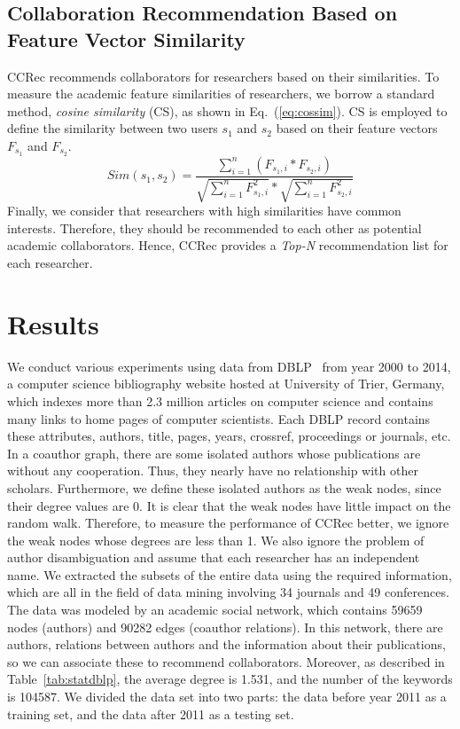 \documentclass[10pt,letterpaper]{article}
\begin{document}
\subsection*{Collaboration Recommendation Based on Feature Vector Similarity}
CCRec recommends collaborators for researchers based on their similarities. To measure the academic feature similarities of researchers, we borrow a standard method, \emph{cosine similarity} (CS), as shown in Eq.~(\ref{eq:cossim}). CS is employed to define the similarity between two users $s_{1}$ and $s_{2}$ based on their feature vectors $F_{s_{1}}$ and $F_{s_{2}}$.
\begin{equation}\label{eq:cossim}
Sim(s_{1},s_{2})=\frac{\sum_{i=1}^{n}(F_{s_{1},i}*F_{s_{2},i})}{\sqrt{\sum_{i=1}^{n}F_{s_{1},i}^2}*\sqrt{\sum_{i=1}^{n}F_{s_{2},i}^2}}
\end{equation}
Finally, we consider that researchers with high similarities have common interests. Therefore, they should be recommended to each other as potential academic collaborators. Hence, CCRec provides a \emph{Top-N} recommendation list for each researcher.

\section*{Results}
We conduct various experiments using data from DBLP~\cite{Ley:DBLP} from year 2000 to 2014, a computer science bibliography website hosted at University of Trier, Germany, which indexes more than 2.3 million articles on computer science and contains many links to home pages of computer scientists. Each DBLP record contains these attributes, authors, title, pages, years, crossref, proceedings or journals, etc. In a coauthor graph, there are some isolated authors whose publications are without any cooperation. Thus, they nearly have no relationship with other scholars. Furthermore, we define these isolated authors as the weak nodes, since their degree values are 0. It is clear that the weak nodes have little impact on the random walk. Therefore, to measure the performance of CCRec better, we ignore the weak nodes whose degrees are less than 1. We also ignore the problem of author disambiguation and assume that each researcher has an independent name. We extracted the subsets of the entire data using the required information, which are all in the field of data mining involving 34 journals and 49 conferences. The data was modeled by an academic social network, which contains 59659 nodes (authors) and 90282 edges (coauthor relations). In this network, there are authors, relations between authors and the information about their publications, so we can associate these to recommend collaborators. Moreover, as described in Table~\ref{tab:statdblp}, the average degree is 1.531, and the number of the keywords is 104587. We divided the data set into two parts: the data before year 2011 as a training set, and the data after 2011 as a testing set.
\end{document}
